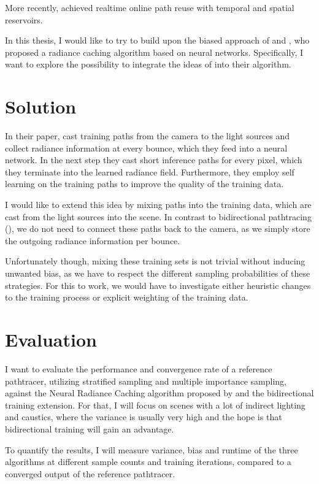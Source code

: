 More recently, \textcite{ouyang2021} achieved realtime online path reuse with temporal and spatial reservoirs.


In this thesis, I would like to try to build upon the biased approach of \textcite{muller2021} and \textcite{muller2022}, who proposed a radiance caching algorithm based on neural networks.
Specifically, I want to explore the possibility to integrate the ideas of \cite{arvo1986} into their algorithm.

\section{Solution}

In their paper, \textcite{muller2021} cast training paths from the camera to the light sources and collect radiance information at every bounce, which they feed into a neural network.
In the next step they cast short inference paths for every pixel, which they terminate into the learned radiance field.
Furthermore, they employ self learning on the training paths to improve the quality of the training data.


I would like to extend this idea by mixing paths into the training data, which are cast from the light sources into the scene.
In contrast to bidirectional pathtracing (\cite{veach1995}), we do not need to connect these paths back to the camera, as we simply store the outgoing radiance information per bounce.


Unfortunately though, mixing these training sets is not trivial without inducing unwanted bias, as we have to respect the different sampling probabilities of these strategies.
For this to work, we would have to investigate either heuristic changes to the training process or explicit weighting of the training data.

\section{Evaluation}

I want to evaluate the performance and convergence rate of a reference pathtracer, utilizing stratified sampling and multiple importance sampling, against the Neural Radiance Caching algorithm proposed by \textcite{muller2021} and the bidirectional training extension.
For that, I will focus on scenes with a lot of indirect lighting and caustics, where the variance is usually very high and the hope is that bidirectional training will gain an advantage.

To quantify the results, I will measure variance, bias and runtime of the three algorithms at different sample counts and training iterations, compared to a converged output of the reference pathtracer.


